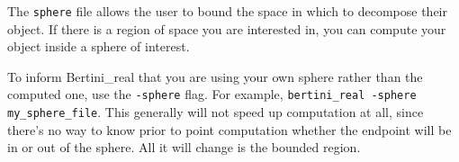 The {\tt sphere} file allows the user to bound the space in which to decompose their object.  
If there is a region of space you are interested in, you can compute your object inside a sphere of interest.

To inform Bertini\_real that you are using your own sphere rather than the computed one, use the {\tt -sphere} flag.  For example, {\tt bertini\_real -sphere my\_sphere\_file}.  This generally will not speed up computation at all, since there's no way to know prior to point computation whether the endpoint will be in or out of the sphere.  All it will change is the bounded region.


